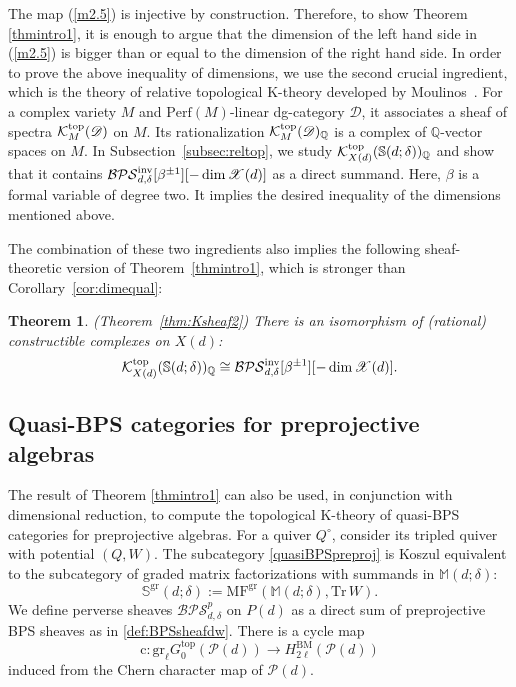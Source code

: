 \documentclass [11pt,oneside,a4paper,mathscr]{amsart}
\newtheorem{thm}{Theorem}[section]
\theoremstyle{definition}
\newcommand{\X}{\mathscr{X}}
\begin{document}
The map (\ref{m2.5}) is injective by 
construction. Therefore, to show Theorem \ref{thmintro1}, it is enough to argue that 
the dimension of the left hand side in (\ref{m2.5}) is bigger than or equal to the 
dimension of the right hand side. In order to prove the above inequality of dimensions, we use the second crucial ingredient, which is the theory of relative topological K-theory developed 
by Moulinos~\cite{Moulinos}. 
For a complex variety $M$ and $\mathrm{Perf}(M)$-linear dg-category 
$\mathscr{D}$, it associates a sheaf of spectra
$\mathcal{K}_M^{\rm{top}}(\mathscr{D})$ on $M$. Its rationalization 
$\mathcal{K}_M^{\rm{top}}(\mathscr{D})_{\mathbb{Q}}$
is a complex of $\mathbb{Q}$-vector spaces on $M$. 
In Subsection~\ref{subsec:reltop},
we study $\mathcal{K}_{X(d)}^{\rm{top}}(\mathbb{S}(d; \delta))_{\mathbb{Q}}$ and 
show that it contains 
$\mathcal{BPS}^{\rm{inv}}_{d, \delta}[\beta^{\pm 1}][-\dim \X(d)]$ 
as a direct summand. Here, $\beta$ is a formal variable of degree two. 
It implies the desired inequality of the dimensions
mentioned above. 

The combination of these two ingredients also implies 
the following sheaf-theoretic version of Theorem~\ref{thmintro1}, which 
is stronger than Corollary~\ref{cor:dimequal}:
\begin{thm}\emph{(Theorem~\ref{thm:Ksheaf2})}
\label{thm:Ksheaf}
There is an isomorphism of (rational) constructible complexes on $X(d)$:
\begin{align*}
    \mathcal{K}_{X(d)}^{\rm{top}}(\mathbb{S}(d; \delta))_{\mathbb{Q}}
    \cong \mathcal{BPS}^{\rm{inv}}_{d, \delta}[\beta^{\pm 1}][-\dim \X(d)]. 
\end{align*}
    \end{thm}




\subsection{Quasi-BPS categories for preprojective algebras}\label{sub15}
The result of 
Theorem \ref{thmintro1} can also be used, in conjunction with dimensional reduction, to compute the topological K-theory of quasi-BPS categories for preprojective algebras.
For a quiver $Q^\circ$, 
consider its tripled quiver with potential $(Q,W)$. The subcategory 
\eqref{quasiBPSpreproj} is 
Koszul equivalent \cite{I} to the subcategory of graded matrix factorizations with summands in $\mathbb{M}(d; \delta)$:
\[\mathbb{S}^{\mathrm{gr}}(d; \delta):=\mathrm{MF}^{\mathrm{gr}}\left(\mathbb{M}(d; \delta), \mathrm{Tr}\,W\right).\]
We define perverse sheaves $\mathcal{BPS}^p_{d,\delta}$ on $P(d)$ 
as a direct sum of preprojective BPS sheaves 
as in \eqref{def:BPSsheafdw}. There is a cycle map 
\begin{equation}\label{cintro2}
\mathrm{c}\colon \mathrm{gr}_\ell G^{\mathrm{top}}_0(\mathscr{P}(d))\to H^{\mathrm{BM}}_{2\ell}(\mathscr{P}(d))\end{equation} induced from the Chern character map of $\mathscr{P}(d)$.
\end{document}
